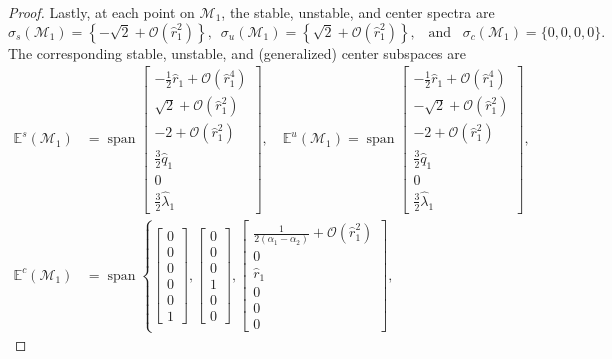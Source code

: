\documentclass[11pt]{article}
\numberwithin{equation}{section}
\begin{document}
\begin{proof}
Lastly, at each point on $\mathcal{M}_1$,
the stable, unstable, and center spectra are
%
\[ \sigma_s(\mathcal M_1) = \left\{ -\sqrt 2 + \mathcal O(\hat r_1^2) \right\}, \, \, \, \sigma_u(\mathcal M_1) = \left\{ \sqrt 2 + \mathcal O(\hat r_1^2) \right\}, \, \, \, \text{ and } \, \, \,  \sigma_c(\mathcal M_1) = \{ 0,0,0,0 \}. \]
%
The corresponding stable, unstable, and (generalized) center subspaces are
%
\begin{equation*}
  \begin{split}
    \mathbb E^s(\mathcal M_1) &= \operatorname{span} \begin{bmatrix} -\tfrac{1}{2} \hat r_1 + \mathcal O(\hat r_1^4) \\ \sqrt 2 + \mathcal O(\hat r_1^2) \\ -2 + \mathcal O(\hat r_1^2) \\ \tfrac{3}{2} \hat q_1 \\ 0 \\ \tfrac{3}{2} \hat \lambda_1 \end{bmatrix}, \quad
    \mathbb E^u(\mathcal M_1) = \operatorname{span} \begin{bmatrix} -\tfrac{1}{2} \hat r_1 + \mathcal O(\hat r_1^4) \\ -\sqrt 2 + \mathcal O(\hat r_1^2) \\ -2 + \mathcal O(\hat r_1^2) \\ \tfrac{3}{2} \hat q_1 \\ 0 \\ \tfrac{3}{2} \hat \lambda_1 \end{bmatrix}, \\
    \mathbb E^c(\mathcal M_1) &= \operatorname{span} \left\{ 
    	\begin{bmatrix} 0 \\ 0 \\ 0 \\ 0 \\ 0 \\ 1 \end{bmatrix}, 
	\begin{bmatrix} 0 \\ 0 \\ 0 \\ 1 \\ 0 \\ 0 \end{bmatrix}, 
	\begin{bmatrix} \tfrac{1}{2(\alpha_1-\alpha_2)} + \mathcal O(\hat r_1^2) \\ 0 \\ \hat r_1 \\ 0 \\ 0 \\ 0 \end{bmatrix}, 

\end{split}
\end{equation*}
\end{proof}
\end{document}
